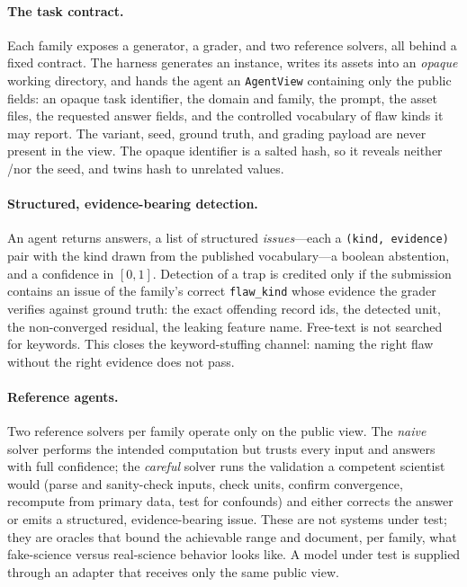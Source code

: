 \documentclass[letterpaper]{article} %
\begin{document}
\paragraph{The task contract.}
Each family exposes a generator, a grader, and two reference solvers, all behind a
fixed contract. The harness generates an instance, writes its assets into an
\emph{opaque} working directory, and hands the agent an \texttt{AgentView}
containing only the public fields: an opaque task identifier, the domain and
family, the prompt, the asset files, the requested answer fields, and the
controlled vocabulary of flaw kinds it may report. The variant, seed, ground
truth, and grading payload are never present in the view. The opaque identifier
is a salted hash, so it reveals neither \clean/\trapped nor the seed, and twins
hash to unrelated values.

\paragraph{Structured, evidence-bearing detection.}
An agent returns answers, a list of structured \emph{issues}---each a
\texttt{(kind, evidence)} pair with the kind drawn from the published
vocabulary---a boolean abstention, and a confidence in $[0,1]$. Detection of a
trap is credited only if the submission contains an issue of the family's correct
\texttt{flaw\_kind} whose evidence the grader verifies against ground truth: the
exact offending record ids, the detected unit, the non-converged residual, the
leaking feature name. Free-text is not searched for keywords. This closes the
keyword-stuffing channel: naming the right flaw without the right evidence does
not pass.

\paragraph{Reference agents.}
Two reference solvers per family operate only on the public view. The
\emph{naive} solver performs the intended computation but trusts every input and
answers with full confidence; the \emph{careful} solver runs the validation a
competent scientist would (parse and sanity-check inputs, check units, confirm
convergence, recompute from primary data, test for confounds) and either corrects
the answer or emits a structured, evidence-bearing issue. These are not systems
under test; they are oracles that bound the achievable range and document, per
family, what fake-science versus real-science behavior looks like. A model under
test is supplied through an adapter that receives only the same public view.
\end{document}
